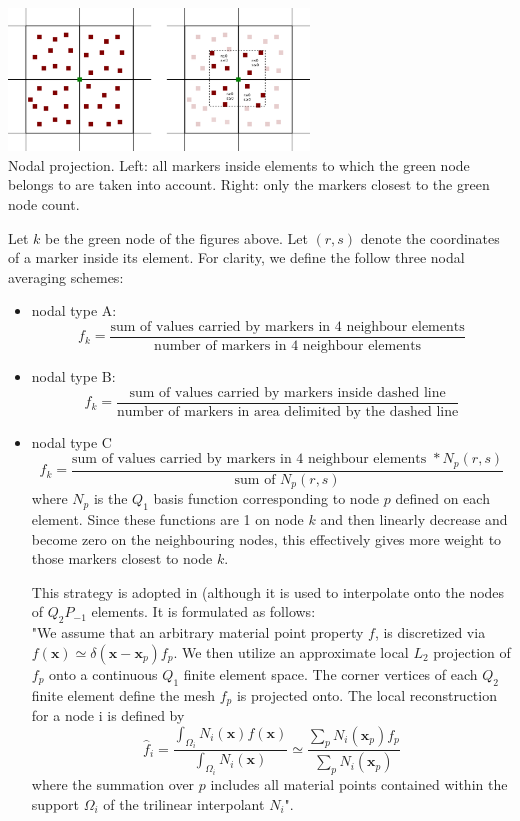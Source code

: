 \begin{center}
\includegraphics[width=8cm]{python_codes/fieldstone_13/markers2}\\
{\small Nodal projection. Left: all markers inside elements to which the green node belongs to are taken into account. Right: only the markers closest to the green node count. }
\end{center}

Let $k$ be the green node of the figures above. Let $(r,s)$ denote the coordinates of a marker inside its element.
For clarity, we define the follow three nodal averaging schemes:
\begin{itemize}
\item nodal type A: 
\[
f_k = \frac{\text{sum of values carried by markers in 4 neighbour elements}}
{\text{number of markers in 4 neighbour elements}}
\]
\item nodal type B: 
\[
f_k = \frac{\text{sum of values carried by markers inside dashed line}}
{\text{number of markers in area delimited by the dashed line}}
\]
\item nodal type C 
\[
f_k = \frac{\text{sum of values carried by markers in 4 neighbour elements } * N_p(r,s)}
{\text{sum of }N_p(r,s)} 
\]
where $N_p$ is the $Q_1$ basis function corresponding to node $p$ defined on each element. Since these 
functions are 1 on node $k$ and then linearly decrease and become zero on the neighbouring nodes, this
effectively gives more weight to those markers closest to node $k$.

This strategy is adopted in \cite{mabl14,mabl15} (although it is used to interpolate onto the nodes of $Q_2P_{-1}$
elements. It is formulated as follows:\\
"We assume that an arbitrary material point property $f$, is discretized via 
$f(\bm x)\simeq \delta(\bm x - \bm x_p) f_p$. We then utilize an approximate local $L_2$ projection
of $f_p$ onto a continuous $Q_1$ finite element space. The corner vertices of
each $Q_2$ finite element define the mesh $f_p$ is projected onto.
The local reconstruction for a node i is defined by
\[
\hat{f}_i = \frac{\int_{\Omega_i}N_i(\bm x) f(\bm x)}{\int_{\Omega_i} N_i(\bm x)} \simeq
\frac{\sum_p N_i(\bm x_p) f_p }{\sum_p N_i(\bm x_p)}
\]
where the summation over $p$ includes all material points 
contained within the support $\Omega_i$ of the trilinear interpolant $N_i$".
\end{itemize}


